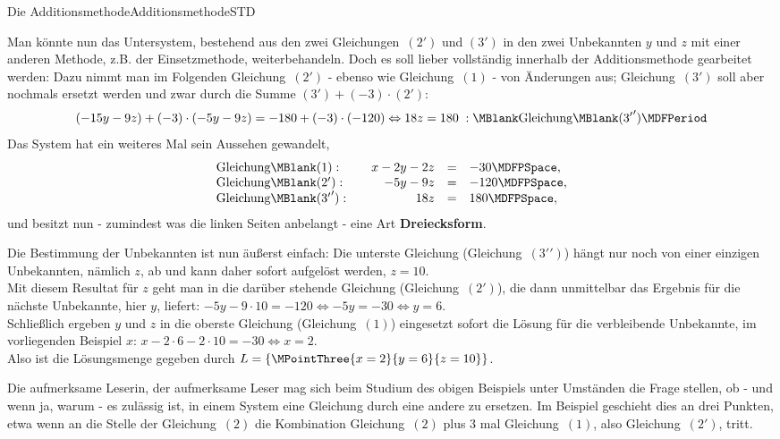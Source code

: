 \begin{MXContent}{Die Additionsmethode}{Additionsmethode}{STD}
\begin{MExample}
Man könnte nun das Untersystem, bestehend aus den zwei Gleichungen~$(2')$ und $(3')$ in den zwei Unbekannten
$y$ und $z$ mit einer anderen Methode, z.B. der Einsetzmethode, weiterbehandeln. Doch es soll lieber vollständig
innerhalb der Additionsmethode gearbeitet werden: Dazu nimmt man im Folgenden Gleichung~$(2')$ - ebenso wie Gleichung~$(1)$ -
von Änderungen aus; Gleichung~$(3')$ soll aber nochmals ersetzt werden und zwar durch die Summe
$(3') + (- 3) \cdot (2')$:
$$(- 15 y - 9 z) + (- 3) \cdot (- 5 y - 9 z) = - 180 + (- 3) \cdot (- 120) \Leftrightarrow
18 z = 180 \; : \MBlank\mbox{Gleichung}\MBlank ({3'}') \MDFPeriod $$
Das System hat ein weiteres Mal sein Aussehen gewandelt,
$$\begin{array}{lcrcl} \mbox{Gleichung}\MBlank (1): & & x - 2 y - 2 z & = & - 30 \MDFPSpace, \\
\mbox{Gleichung}\MBlank (2'): & & - 5 y - 9 z & = & - 120 \MDFPSpace, \\
\mbox{Gleichung}\MBlank ({3'}'): & & 18 z & = &  180 \MDFPSpace, \end{array}$$
und besitzt nun - zumindest was die linken Seiten anbelangt - eine Art \textbf{Dreiecksform}.%

Die Bestimmung der Unbekannten ist nun äußerst einfach: Die unterste Gleichung (Gleichung~$({3'}')$) hängt nur noch
von einer einzigen Unbekannten, nämlich $z$, ab und kann daher sofort aufgelöst werden, $z = 10$.\\
Mit diesem Resultat für $z$ geht man in die darüber stehende Gleichung (Gleichung~$(2')$), die dann unmittelbar
das Ergebnis für die nächste Unbekannte, hier $y$, liefert: $- 5 y - 9 \cdot 10 = - 120 \Leftrightarrow - 5 y =
- 30 \Leftrightarrow y = 6$.\\
Schließlich ergeben $y$ und $z$ in die oberste Gleichung (Gleichung~$(1)$) eingesetzt sofort die Lösung
für die verbleibende Unbekannte, im vorliegenden Beispiel $x$: $x - 2 \cdot 6 - 2 \cdot 10 = - 30 \Leftrightarrow
x = 2$.\\
Also ist die Lösungsmenge gegeben durch ${\ML} = \{ \MPointThree{x = 2}{y = 6}{z = 10} \}$.%
\end{MExample}
Die aufmerksame Leserin, der aufmerksame Leser mag sich beim Studium des obigen Beispiels unter Umständen die Frage
stellen, ob - und wenn ja, warum - es zulässig ist, in einem System eine Gleichung durch eine andere zu ersetzen.%
Im Beispiel geschieht dies an drei Punkten, etwa wenn an die Stelle der Gleichung~$(2)$ die Kombination Gleichung~$(2)$
plus $3$ mal Gleichung~$(1)$, also Gleichung~$(2')$, tritt.


\end{MXContent}

